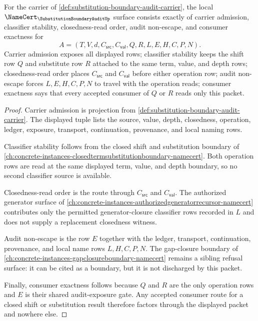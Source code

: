\begin{theorem}
\label{thm:substitution-boundary-audit-namecert-obligations}
For the carrier of \autoref{def:substitution-boundary-audit-carrier}, the local $\NameCert_{\SubstitutionBoundaryAuditUp}$ surface consists exactly of carrier admission, classifier stability, closedness-read order, audit non-escape, and consumer exactness for
$$
A=(T,V,d,C_{\mathsf{src}},C_{\mathsf{val}},Q,R,L,E,H,C,P,N).
$$
Carrier admission exposes all displayed rows; classifier stability keeps the shift row $Q$ and substitute row $R$ attached to the same term, value, and depth rows; closedness-read order places $C_{\mathsf{src}}$ and $C_{\mathsf{val}}$ before either operation row; audit non-escape forces $L,E,H,C,P,N$ to travel with the operation reads; consumer exactness says that every accepted consumer of $Q$ or $R$ reads only this packet.
\end{theorem}
\begin{proof}
Carrier admission is projection from \autoref{def:substitution-boundary-audit-carrier}. The displayed tuple lists the source, value, depth, closedness, operation, ledger, exposure, transport, continuation, provenance, and local naming rows.

Classifier stability follows from the closed shift and substitution boundary of \autoref{ch:concrete-instances-closedtermsubstitutionboundary-namecert}. Both operation rows are read at the same displayed term, value, and depth boundary, so no second classifier source is available.

Closedness-read order is the route through $C_{\mathsf{src}}$ and $C_{\mathsf{val}}$. The authorized generator surface of \autoref{ch:concrete-instances-authorizedgeneratorrecursor-namecert} contributes only the permitted generator-closure classifier rows recorded in $L$ and does not supply a replacement closedness witness.

Audit non-escape is the row $E$ together with the ledger, transport, continuation, provenance, and local name rows $L,H,C,P,N$. The gap-closure boundary of \autoref{ch:concrete-instances-gapclosureboundary-namecert} remains a sibling refusal surface: it can be cited as a boundary, but it is not discharged by this packet.

Finally, consumer exactness follows because $Q$ and $R$ are the only operation rows and $E$ is their shared audit-exposure gate. Any accepted consumer route for a closed shift or substitution result therefore factors through the displayed packet and nowhere else.
\end{proof}

